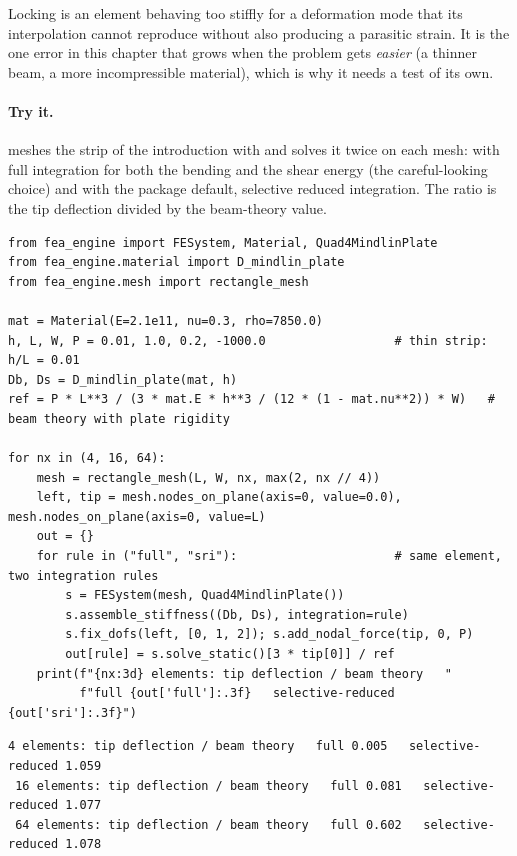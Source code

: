 Locking is an element behaving too stiffly for a deformation mode that its interpolation cannot reproduce without also producing a parasitic strain. It is the one error in this chapter that grows when the problem gets \emph{easier} (a thinner beam, a more incompressible material), which is why it needs a test of its own.

\paragraph{Try it.}  meshes the strip of the introduction with  and solves it twice on each mesh: with full integration for both the bending and the shear energy (the careful-looking choice) and with the package default, selective reduced integration. The ratio is the tip deflection divided by the beam-theory value.

\begin{lstlisting}[caption={A thin cantilever strip with two integration rules for the same plate element (run with the package on the path).},label={lst:el-try}]
from fea_engine import FESystem, Material, Quad4MindlinPlate
from fea_engine.material import D_mindlin_plate
from fea_engine.mesh import rectangle_mesh

mat = Material(E=2.1e11, nu=0.3, rho=7850.0)
h, L, W, P = 0.01, 1.0, 0.2, -1000.0                  # thin strip: h/L = 0.01
Db, Ds = D_mindlin_plate(mat, h)
ref = P * L**3 / (3 * mat.E * h**3 / (12 * (1 - mat.nu**2)) * W)   # beam theory with plate rigidity

for nx in (4, 16, 64):
    mesh = rectangle_mesh(L, W, nx, max(2, nx // 4))
    left, tip = mesh.nodes_on_plane(axis=0, value=0.0), mesh.nodes_on_plane(axis=0, value=L)
    out = {}
    for rule in ("full", "sri"):                      # same element, two integration rules
        s = FESystem(mesh, Quad4MindlinPlate())
        s.assemble_stiffness((Db, Ds), integration=rule)
        s.fix_dofs(left, [0, 1, 2]); s.add_nodal_force(tip, 0, P)
        out[rule] = s.solve_static()[3 * tip[0]] / ref
    print(f"{nx:3d} elements: tip deflection / beam theory   "
          f"full {out['full']:.3f}   selective-reduced {out['sri']:.3f}")
\end{lstlisting}

\begin{lstlisting}[numbers=none,language={},keywordstyle={},commentstyle={},frame=single,aboveskip=2pt]
  4 elements: tip deflection / beam theory   full 0.005   selective-reduced 1.059
 16 elements: tip deflection / beam theory   full 0.081   selective-reduced 1.077
 64 elements: tip deflection / beam theory   full 0.602   selective-reduced 1.078
\end{lstlisting}

